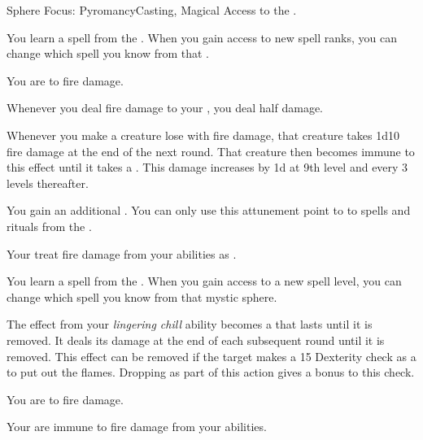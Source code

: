     \begin{feat}{Sphere Focus: Pyromancy}{Casting, Magical}
        \featpre Access to the  .

         You learn a spell from the  .
        When you gain access to new spell ranks, you can change which spell you know from that .

         You are  to fire damage.

         Whenever you deal fire damage to your , you deal half damage.

         Whenever you make a creature lose  with fire damage, that creature takes 1d10 fire damage at the end of the next round.
        That creature then becomes immune to this effect until it takes a .
        This damage increases by \plus1d at 9th level and every 3 levels thereafter.

         You gain an additional .
        You can only use this attunement point to  to spells and rituals from the  .

         Your  treat fire damage from your abilities as .

         You learn a spell from the  .
        When you gain access to a new spell level, you can change which spell you know from that mystic sphere.

         The effect from your \textit{lingering chill} ability becomes a  that lasts until it is removed.
        It deals its damage at the end of each subsequent round until it is removed.
        This effect can be removed if the target makes a  15 Dexterity check as a  to put out the flames.
        Dropping \prone as part of this action gives a  bonus to this check.

         You are  to fire damage.

         Your  are immune to fire damage from your abilities.
    \end{feat}

